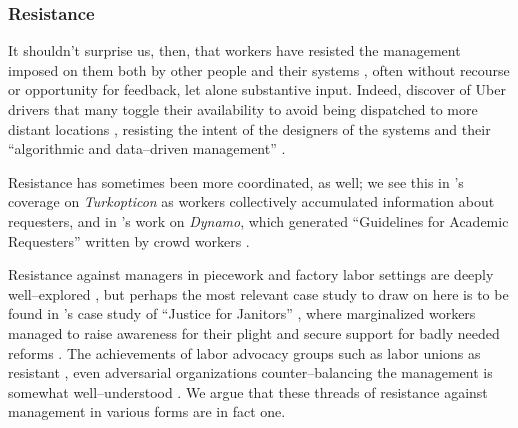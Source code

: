 \documentclass[trackingWork]{subfiles}
\begin{document}
{    \subsubsection{Resistance}
    It shouldn't surprise us, then, that workers have resisted the management imposed on them both by other people and their systems%
,     often without recourse or opportunity for feedback, let alone substantive input.
    Indeed, \citeauthor{uberAlgorithm} discover of Uber drivers that 
    many toggle their availability to avoid being dispatched to more distant locations%
,     resisting the intent of the designers of the systems and their ``algorithmic and data--driven management''
    \cite{uberAlgorithm}.

    Resistance has sometimes been more coordinated, as well;
    we see this in \citeauthor{turkopticon}'s coverage on \textit{Turkopticon} as workers collectively accumulated information about requesters, and
    in \citeauthor{dynamo}'s work on \textit{Dynamo}, which generated ``Guidelines for Academic Requesters'' written by crowd workers
    \cite{turkopticon,dynamo}.

    Resistance against managers in piecework and factory labor settings are deeply well--explored%
,     but perhaps the most relevant case study to draw on here is to be found in
    \citeauthor{waldinger1996helots}'s case study of ``Justice for Janitors''%
,     where marginalized workers managed to raise awareness for their plight and secure support for badly needed reforms
    \cite{waldinger1996helots}.
    The achievements of labor advocacy groups such as labor unions as resistant%
,     even adversarial organizations counter--balancing the management
    is somewhat well--understood
    \cite{russell1982collective,craig1992behavior}.
    We argue that these threads of resistance against management in various forms
    are in fact one.
  }
\end{document}
